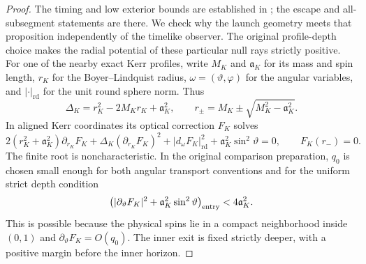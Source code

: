 \begin{proof}
The timing and low exterior bounds are established in
\cite[, , and ]{Foundation}; the escape and all-subsegment
statements are  there.
We check why the launch geometry meets that proposition independently
of the timelike observer. The original profile-depth choice makes the
radial potential of these particular null rays strictly positive.
For one of the nearby exact Kerr profiles, write $M_K$ and
$\mathfrak a_K$ for its mass and spin length, $r_K$ for the
Boyer--Lindquist radius, $\omega=(\vartheta,\varphi)$ for the
angular variables, and $|\cdot|_{\mathrm{rd}}$ for the unit round
sphere norm. Thus
\[
 \Delta_K=r_K^2-2M_Kr_K+\mathfrak a_K^2,\qquad
 r_\pm=M_K\pm\sqrt{M_K^2-\mathfrak a_K^2}.
\]
In aligned Kerr coordinates its optical correction $F_K$ solves
\begin{equation}\label{bg:profile-eikonal}
 2(r_K^2+\mathfrak a_K^2)\partial_{r_K}F_K
 +\Delta_K(\partial_{r_K}F_K)^2
 +|d_\omega F_K|_{\mathrm{rd}}^2
 +\mathfrak a_K^2\sin^2\vartheta=0,
 \qquad F_K(r_-)=0.
\end{equation}
The finite root is noncharacteristic.  In the original comparison
preparation, $q_0$ is chosen small enough for both angular transport
conventions and for the uniform strict depth condition
\begin{equation}\label{bg:profile-depth}
 \left(|\partial_\vartheta F_K|^2
              +\mathfrak a_K^2\sin^2\vartheta\right)_{\rm entry}
                   <4\mathfrak a_K^2.
\end{equation}
This is possible because the physical spins lie in a compact
neighborhood inside $(0,1)$ and $\partial_\vartheta F_K=O(q_0)$.
The inner exit is fixed strictly deeper, with a positive margin
before the inner horizon.


\end{proof}
